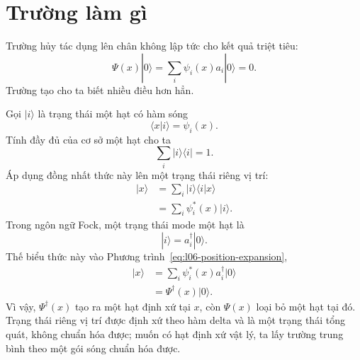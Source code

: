 \begin{classroomqa}\end{classroomqa}

\section{Trường làm gì}

Trường hủy tác dụng lên chân không lập tức cho kết quả triệt tiêu:
\begin{equation}
\Psi(x)|0\rangle
=\sum_i\psi_i(x)a_i|0\rangle
=0.
\label{eq:l06-field-kills-vacuum}
\end{equation}
Trường tạo cho ta biết nhiều điều hơn hẳn.

Gọi \(|i\rangle\) là trạng thái một hạt có hàm sóng
\begin{equation}
\langle x|i\rangle=\psi_i(x).
\end{equation}
Tính đầy đủ của cơ sở một hạt cho ta
\begin{equation}
\sum_i|i\rangle\langle i|=1.
\label{eq:l06-completeness}
\end{equation}
Áp dụng đồng nhất thức này lên một trạng thái riêng vị trí:
\begin{align}
|x\rangle
&=\sum_i|i\rangle\langle i|x\rangle \\
&=\sum_i\psi_i^*(x)|i\rangle.
\label{eq:l06-position-expansion}
\end{align}
Trong ngôn ngữ Fock, một trạng thái mode một hạt là
\begin{equation}
|i\rangle=a_i^\dagger|0\rangle.
\end{equation}
Thế biểu thức này vào Phương trình~\eqref{eq:l06-position-expansion},
\begin{align}
|x\rangle
&=\sum_i\psi_i^*(x)a_i^\dagger|0\rangle \\
&=\Psi^\dagger(x)|0\rangle.
\label{eq:l06-local-creation}
\end{align}
Vì vậy, \(\Psi^\dagger(x)\) tạo ra một hạt định xứ tại \(x\), còn \(\Psi(x)\) loại bỏ một hạt tại đó. Trạng thái riêng vị trí được định xứ theo hàm delta và là một trạng thái tổng quát, không chuẩn hóa được; muốn có hạt định xứ vật lý, ta lấy trường trung bình theo một gói sóng chuẩn hóa được.

